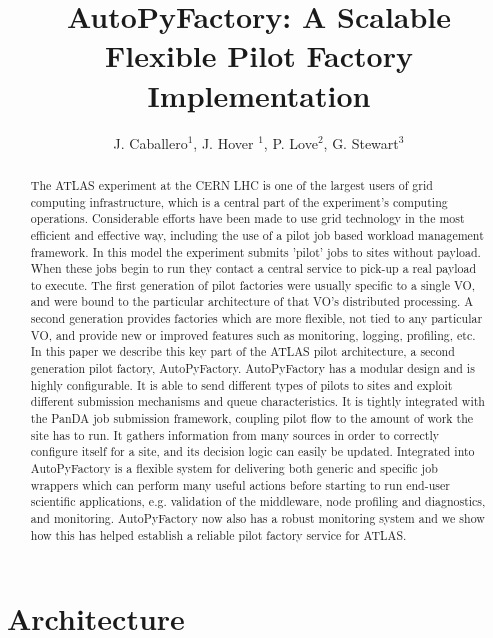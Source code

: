 \documentclass[a4paper]{jpconf}
\begin{document}
\title{AutoPyFactory: A Scalable Flexible Pilot Factory Implementation}

\author{J. Caballero$^1$, J. Hover $^1$, P. Love$^2$, G. Stewart$^3$}

\address{$^1$ Brookhaven National Laboratory, PO BOX 5000 Upton, NY 11973, USA}
\address{$^2$ Department of Physics, Lancaster University, Lancaster, LA1 4YB, UK }
\address{$^3$ Department of Physics and Astronomy, University of Glasgow, Glasgow G12 8QQ, UK}


\begin{abstract}
The ATLAS experiment at the CERN LHC is one of the largest users of grid computing
infrastructure, which is a central part of the experiment's computing operations.
Considerable efforts have been made to use grid technology in the most efficient
and effective way, including the use of a pilot job based workload management framework.
In this model the experiment submits 'pilot' jobs to sites without payload. When these
jobs begin to run they contact a central service to pick-up a real payload to execute.
The first generation of pilot factories were usually specific to a single VO, and were
bound to the particular architecture of that VO's distributed processing. A second
generation provides factories which are more flexible, not tied to any particular VO,
and provide new or improved features such as monitoring, logging, profiling, etc.
In this paper we describe this key part of the ATLAS pilot architecture, a second
generation pilot factory, AutoPyFactory.
AutoPyFactory has a modular design and is highly configurable. It is able to send
different types of pilots to sites and exploit different submission mechanisms and queue
characteristics. It is tightly integrated with the PanDA job submission framework,
coupling pilot flow to the amount of work the site has to run. It gathers information
from many sources in order to correctly configure itself for a site, and its decision logic
can easily be updated.
Integrated into AutoPyFactory is a flexible system for delivering both generic and
specific job wrappers which can perform many useful actions before starting to run
end-user scientific applications, e.g. validation of the middleware, node profiling
and diagnostics, and monitoring.
AutoPyFactory now also has a robust monitoring system and we show how this has helped
establish a reliable pilot factory service for ATLAS.
\end{abstract}


\section{Architecture}
\end{document}
